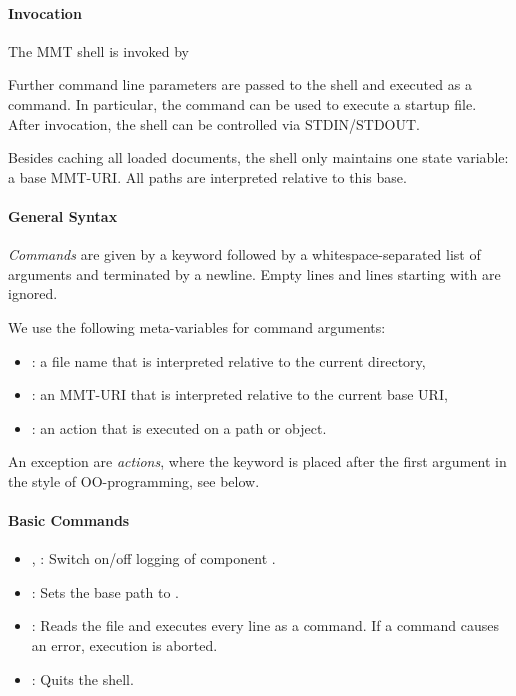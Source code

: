 \paragraph{Invocation}
The MMT shell is invoked by
\begin{center}
\end{center}
Further command line parameters are passed to the shell and executed as a command. In particular, the command  can be used to execute a startup file. After invocation, the shell can be controlled via STDIN/STDOUT.

Besides caching all loaded documents, the shell only maintains one state variable: a base MMT-URI. All paths are interpreted relative to this base.

\paragraph{General Syntax}
\emph{Commands} are given by a keyword followed by a whitespace-separated list of arguments and terminated by a newline. Empty lines and lines starting with \code{//} are ignored.

We use the following meta-variables for command arguments:
\begin{itemize}
	\item {}: a file name that is interpreted relative to the current directory,
	\item {}: an MMT-URI that is interpreted relative to the current base URI,
	\item {}: an action that is executed on a path or object.
\end{itemize}

An exception are \emph{actions}, where the keyword is placed after the first argument in the style of OO-programming, see below.

\paragraph{Basic Commands}
\begin{itemize}
\item {},  : Switch on/off logging of component .
\item {}: Sets the base path to .
\item {}: Reads the file  and executes every line as a command. If a command causes an error, execution is aborted.
\item {}: Quits the shell.
\end{itemize}

